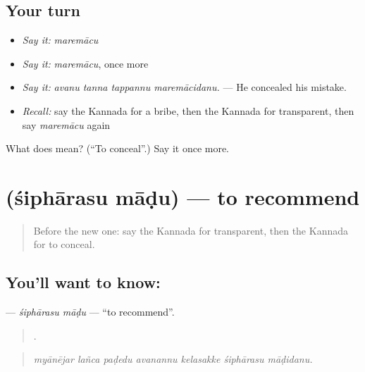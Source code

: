 \subsection*{Your turn}
\begin{itemize}
\raggedright
  \item \emph{Say it:} \emph{maremācu}
  \item \emph{Say it:} \emph{maremācu}, once more
  \item \emph{Say it:} \emph{avanu tanna tappannu maremācidanu.} — He concealed his mistake.
  \item \emph{Recall:} say the Kannada for a bribe, then the Kannada for transparent, then say \emph{maremācu} again
\end{itemize}

\begin{tcolorbox}[breakable,colback=teal!4,colframe=teal!35!black,title={Before you move on}]
What does  mean? (\textquotedblleft{}To conceal\textquotedblright{}.) Say it once more.
\end{tcolorbox}
\section[\texorpdfstring{\kn{ಶಿಫಾರಸು} \kn{ಮಾಡು} (śiphārasu māḍu)}{ಶಿಫಾರಸು ಮಾಡು (śiphārasu māḍu)}]{  (śiphārasu māḍu) — to recommend}

\label{lesson:KA-C402-sipharasu-madu}



\begin{quote}
Before the new one: say the Kannada for transparent, then the Kannada for to conceal.
\end{quote}

\subsection*{You'll want to know:  }
\textbf{ } — \emph{śiphārasu māḍu} — \textquotedblleft{}to recommend\textquotedblright{}.

\begin{quote}
      .
\end{quote}

\begin{quote}
\emph{myānējar lañca paḍedu avanannu kelasakke śiphārasu māḍidanu.}
\end{quote}

